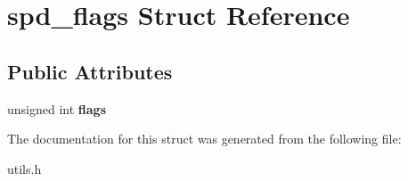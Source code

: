 \hypertarget{structspd__flags}{
\section{spd\_\-flags Struct Reference}
\label{structspd__flags}
}
\subsection*{Public Attributes}
\begin{DoxyCompactItemize}
\item 
\hypertarget{structspd__flags_abbdd60ba8d3c27ffcbda7fc22c053eff}{
unsigned int {\bfseries flags}}
\label{structspd__flags_abbdd60ba8d3c27ffcbda7fc22c053eff}

\end{DoxyCompactItemize}


The documentation for this struct was generated from the following file:\begin{DoxyCompactItemize}
\item 
utils.h\end{DoxyCompactItemize}
